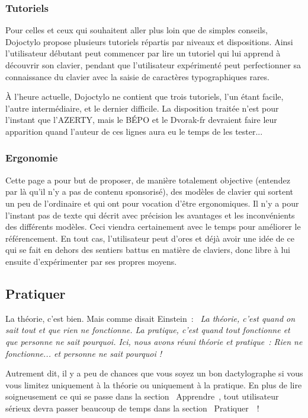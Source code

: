 \documentclass[a4paper,12pt]{article}
\begin{document}
\subsubsection{Tutoriels}

Pour celles et ceux qui souhaitent aller plus loin que de simples conseils, Dojoctylo propose plusieurs tutoriels répartis par niveaux et dispositions. Ainsi l'utilisateur débutant peut commencer par lire un tutoriel qui lui apprend à découvrir son clavier, pendant que l'utilisateur expérimenté peut perfectionner sa connaissance du clavier avec la saisie de caractères typographiques rares.

À l'heure actuelle, Dojoctylo ne contient que trois tutoriels, l'un étant facile, l'autre intermédiaire, et le dernier difficile. La disposition traitée n'est pour l'instant que l'AZERTY, mais le BÉPO et le Dvorak-fr devraient faire leur apparition quand l'auteur de ces lignes aura eu le temps de les tester...

\subsubsection{Ergonomie}

Cette page a pour but de proposer, de manière totalement objective (entendez par là qu'il n'y a pas de contenu sponsorisé), des modèles de clavier qui sortent un peu de l'ordinaire et qui ont pour vocation d'être ergonomiques. Il n'y a pour l'instant pas de texte qui décrit avec précision les avantages et les inconvénients des différents modèles. Ceci viendra certainement avec le temps pour améliorer le référencement. En tout cas, l'utilisateur peut d'ores et déjà avoir une idée de ce qui se fait en dehors des sentiers battus en matière de claviers, donc libre à lui ensuite d'expérimenter par ses propres moyens.

\subsection{Pratiquer}

La théorie, c'est bien. Mais comme disait Einstein~: \textit{\og~La théorie, c'est quand on sait tout et que rien ne fonctionne. La pratique, c'est quand tout fonctionne et que personne ne sait pourquoi. Ici, nous avons réuni théorie et pratique~: Rien ne fonctionne... et personne ne sait pourquoi !~\fg}

Autrement dit, il y a peu de chances que vous soyez un bon dactylographe si vous vous limitez uniquement à la théorie ou uniquement à la pratique. En plus de lire soigneusement ce qui se passe dans la section \og~Apprendre~\fg, tout utilisateur sérieux devra passer beaucoup de temps dans la section \og~Pratiquer~\fg~!
\end{document}
